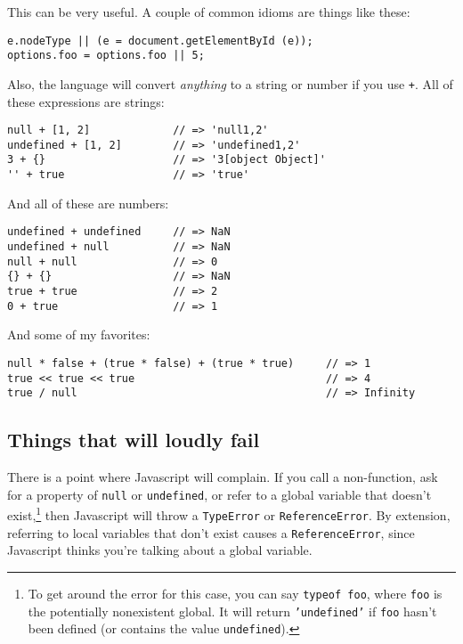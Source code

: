 \documentclass{article}
\begin{document}
    This can be very useful. A couple of common idioms are things like these:

\begin{verbatim}
e.nodeType || (e = document.getElementById (e));
options.foo = options.foo || 5;
\end{verbatim}

    Also, the language will convert {\it anything} to a string or number if you use \verb|+|. All of these expressions are strings:

\begin{verbatim}
null + [1, 2]             // => 'null1,2'
undefined + [1, 2]        // => 'undefined1,2'
3 + {}                    // => '3[object Object]'
'' + true                 // => 'true'
\end{verbatim}

    And all of these are numbers:

\begin{verbatim}
undefined + undefined     // => NaN
undefined + null          // => NaN
null + null               // => 0
{} + {}                   // => NaN
true + true               // => 2
0 + true                  // => 1
\end{verbatim}

    And some of my favorites:

\begin{verbatim}
null * false + (true * false) + (true * true)     // => 1
true << true << true                              // => 4
true / null                                       // => Infinity
\end{verbatim}

\subsection {Things that will loudly fail}
    There is a point where Javascript will complain. If you call a non-function, ask for a property of \verb|null| or \verb|undefined|, or refer to a global variable that doesn't
    exist,\footnote{To get around the error for this case, you can say {\tt typeof foo}, where {\tt foo} is the potentially nonexistent global. It will return {\tt 'undefined'} if
    {\tt foo} hasn't been defined (or contains the value {\tt undefined}).} then Javascript will throw a \verb|TypeError| or \verb|ReferenceError|. By extension, referring to local variables
    that don't exist causes a \verb|ReferenceError|, since Javascript thinks you're talking about a global variable.
\end{document}
